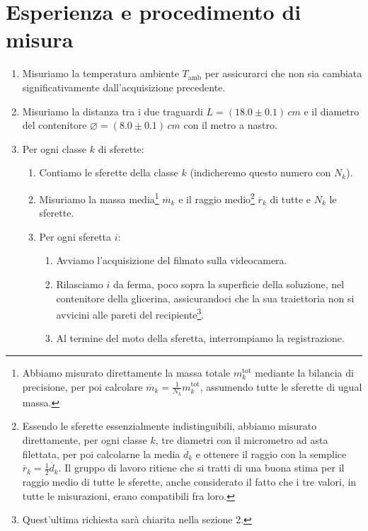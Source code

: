 \documentclass{article}
\newcommand*{\diam}{\varnothing}
\begin{document}
\pagebreak
\section{Esperienza e procedimento di misura}

\begin{enumerate}
  \item Misuriamo la temperatura ambiente $T_\text{amb}$ per assicurarci
    che non sia cambiata significativamente dall'acquisizione precedente.
  \item Misuriamo la distanza tra i due traguardi $L = (18.0\pm0.1)\,\unit{cm}$
    e il diametro del contenitore $\diam = (8.0\pm0.1)\,\unit{cm}$
    con il metro a nastro.
  \item Per ogni classe $k$ di sferette:
  \begin{enumerate}
    \item
      Contiamo le sferette della classe $k$ (indicheremo questo numero
      con $N_k$).
    \item
      Misuriamo la massa media\footnote{
        Abbiamo misurato direttamente la massa totale $m_k^\text{tot}$
        mediante la bilancia di precisione, per poi calcolare
        $\overline{m}_k = \frac{1}{N_k} m_k^\text{tot}$,
        assumendo tutte le sferette di ugual massa.
      } $\overline{m}_k$ e il raggio medio\footnote{
        Essendo le sferette essenzialmente indistinguibili, abbiamo
        misurato direttamente, per ogni classe $k$, tre diametri con
        il micrometro ad asta filettata, per poi calcolarne la media
        $\overline{d}_k$ e ottenere il raggio con la semplice
        $\overline{r}_k = \frac{1}{2} \overline{d}_k$.
        Il gruppo di lavoro ritiene che si tratti di una buona stima
        per il raggio medio di tutte le sferette, anche considerato
        il fatto che i tre valori, in tutte le misurazioni, erano
        compatibili fra loro.
      } $\overline{r}_k$ di tutte e $N_k$ le sferette.
    \item Per ogni sferetta $i$:
    \begin{enumerate}
      \item
        Avviamo l'acquisizione del filmato sulla videocamera.
      \item
        Rilasciamo $i$ da ferma, poco sopra la superficie della soluzione,
        nel contenitore della glicerina, assicurandoci che la sua traiettoria
        non si avvicini alle pareti del recipiente\footnote{
          Quest'ultima richiesta sarà chiarita nella sezione 2.
        }.
      \item
        Al termine del moto della sferetta, interrompiamo la registrazione.
    \end{enumerate}
  \end{enumerate}
\end{enumerate}
\end{document}
